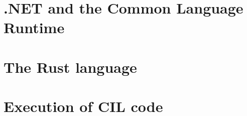 \section{.NET and the Common Language Runtime}

\section{The Rust language}

\section{Execution of CIL code}
